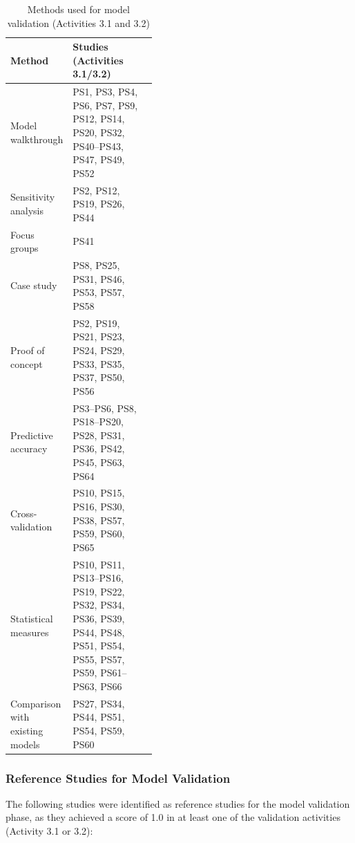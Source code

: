 \begin{table}[t]
\caption{Methods used for model validation (Activities 3.1 and 3.2)}
\label{tab:app_methods_model_validation}
\centering
\small
\setlength{\tabcolsep}{4pt}
\renewcommand{\arraystretch}{1.15}
\begin{tabularx}{\linewidth}{@{}>{\raggedright\arraybackslash}p{0.42\linewidth}
                            >{\raggedright\arraybackslash}X@{}}
\toprule
\textbf{Method} & \textbf{Studies (Activities 3.1/3.2)} \\
\midrule
Model walkthrough
& PS1, PS3, PS4, PS6, PS7, PS9, PS12, PS14, PS20, PS32, PS40--PS43, PS47, PS49, PS52 \\

Sensitivity analysis
& PS2, PS12, PS19, PS26, PS44 \\

Focus groups
& PS41 \\

Case study
& PS8, PS25, PS31, PS46, PS53, PS57, PS58 \\

Proof of concept
& PS2, PS19, PS21, PS23, PS24, PS29, PS33, PS35, PS37, PS50, PS56 \\

Predictive accuracy
& PS3--PS6, PS8, PS18--PS20, PS28, PS31, PS36, PS42, PS45, PS63, PS64 \\

Cross-validation
& PS10, PS15, PS16, PS30, PS38, PS57, PS59, PS60, PS65 \\

Statistical measures
& PS10, PS11, PS13--PS16, PS19, PS22, PS32, PS34, PS36, PS39, PS44, PS48, PS51, PS54, PS55, PS57, PS59, PS61--PS63, PS66 \\

Comparison with existing models
& PS27, PS34, PS44, PS51, PS54, PS59, PS60 \\

\bottomrule
\end{tabularx}
\end{table}

\subsubsection{Reference Studies for Model Validation}

The following studies were identified as reference studies for the model validation phase, as they achieved a score of 1.0 in at least one of the validation activities (Activity 3.1 or 3.2):

